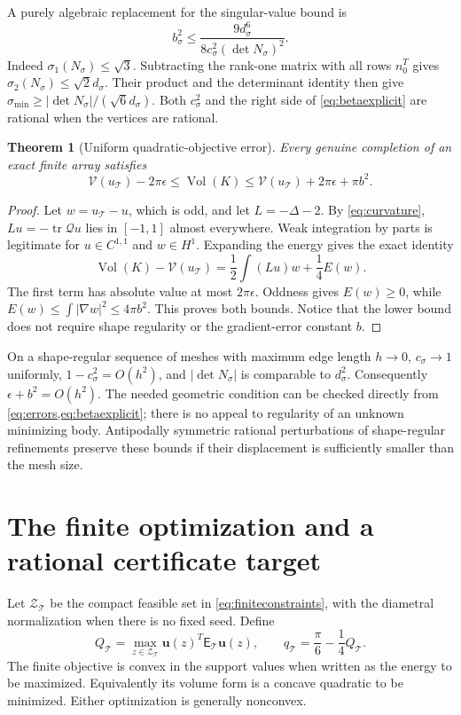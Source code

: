 \documentclass[11pt]{article}
\newtheorem{theorem}{Theorem}[section]
\theoremstyle{remark}\newtheorem{remark}[theorem]{Remark}
\newcommand{\Vol}{\operatorname{Vol}}
\newcommand{\Q}{\mathcal Q}
\newcommand{\tr}{\operatorname{tr}}
\numberwithin{equation}{section}
\begin{document}
A purely algebraic replacement for the singular-value bound is
\begin{equation}\label{eq:betaexplicit}
 b_\sigma^2\le
 \frac{9d_\sigma^6}{8c_\sigma^2(\det N_\sigma)^2}.
\end{equation}
Indeed $\sigma_1(N_\sigma)\le\sqrt3$. Subtracting the rank-one matrix with
all rows $n_0^T$ gives $\sigma_2(N_\sigma)\le\sqrt2d_\sigma$.
Their product and the determinant identity then give
$\sigma_{\min}\ge|\det N_\sigma|/(\sqrt6d_\sigma)$.
Both $c_\sigma^2$ and the right side of \cref{eq:betaexplicit} are rational
when the vertices are rational.

\begin{theorem}[Uniform quadratic-objective error]\label{thm:volumeerror}
Every genuine completion of an exact finite array satisfies
\begin{equation}\label{eq:errorbound}
 \boxed{\mathcal V(u_{\mathcal T})-2\pi\epsilon
 \le\Vol(K)\le
 \mathcal V(u_{\mathcal T})+2\pi\epsilon+\pi b^2.}
\end{equation}
\end{theorem}
\begin{proof}
Let $w=u_{\mathcal T}-u$, which is odd, and let $L=-\Delta-2$.
By \cref{eq:curvature}, $Lu=-\tr\Q u$ lies in $[-1,1]$ almost everywhere.
Weak integration by parts is legitimate for $u\in C^{1,1}$ and
$w\in H^1$. Expanding the energy gives the exact identity
\[
 \Vol(K)-\mathcal V(u_{\mathcal T})
 =\frac12\int (Lu)w+\frac14 E(w).
\]
The first term has absolute value at most $2\pi\epsilon$.
Oddness gives $E(w)\ge0$, while
$E(w)\le\int|\nabla w|^2\le4\pi b^2$.
This proves both bounds. Notice that the lower bound does not require
shape regularity or the gradient-error constant $b$.
\end{proof}

On a shape-regular sequence of meshes with maximum edge length $h\to0$,
$c_\sigma\to1$ uniformly, $1-c_\sigma^2=O(h^2)$, and
$|\det N_\sigma|$ is comparable to $d_\sigma^2$. Consequently
$\epsilon+b^2=O(h^2)$.
The needed geometric condition can be checked directly from
\cref{eq:errors,eq:betaexplicit}; there is no appeal to regularity of an
unknown minimizing body. Antipodally symmetric rational perturbations of
shape-regular refinements preserve these bounds if their displacement is
sufficiently smaller than the mesh size.

\section{The finite optimization and a rational certificate target}
Let $\mathcal Z_{\mathcal T}$ be the compact feasible set in
\cref{eq:finiteconstraints}, with the diametral normalization when there is
no fixed seed. Define
\[
 Q_{\mathcal T}=\max_{z\in\mathcal Z_{\mathcal T}}
          \mathbf u(z)^T\mathsf E_{\mathcal T}\mathbf u(z),\qquad
 q_{\mathcal T}=\frac\pi6-\frac14Q_{\mathcal T}.
\]
The finite objective is convex in the support values when written as the
energy to be maximized. Equivalently its volume form is a concave quadratic
to be minimized. Either optimization is generally nonconvex.
\end{document}
